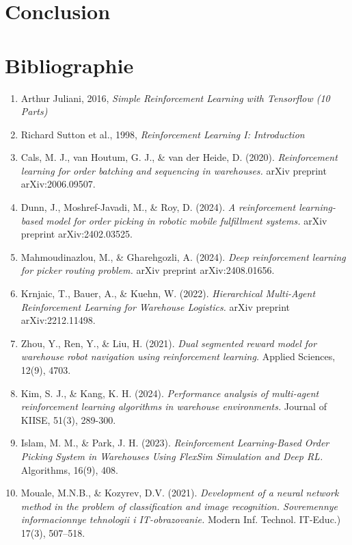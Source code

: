 \documentclass{article}
\begin{document}
\section*{Conclusion}

\section*{Bibliographie}
\begin{enumerate}
    \item Arthur Juliani, 2016, \textit{Simple Reinforcement Learning with Tensorflow (10 Parts)}
    \item Richard Sutton et al., 1998, \textit{Reinforcement Learning I: Introduction}
    \item Cals, M. J., van Houtum, G. J., \& van der Heide, D. (2020). \textit{Reinforcement learning for order batching and sequencing in warehouses.} arXiv preprint arXiv:2006.09507.
    \item Dunn, J., Moshref-Javadi, M., \& Roy, D. (2024). \textit{A reinforcement learning-based model for order picking in robotic mobile fulfillment systems.} arXiv preprint arXiv:2402.03525.
    \item Mahmoudinazlou, M., \& Gharehgozli, A. (2024). \textit{Deep reinforcement learning for picker routing problem.} arXiv preprint arXiv:2408.01656.
    \item Krnjaic, T., Bauer, A., \& Kuehn, W. (2022). \textit{Hierarchical Multi-Agent Reinforcement Learning for Warehouse Logistics.} arXiv preprint arXiv:2212.11498.
    \item Zhou, Y., Ren, Y., \& Liu, H. (2021). \textit{Dual segmented reward model for warehouse robot navigation using reinforcement learning.} Applied Sciences, 12(9), 4703.
    \item Kim, S. J., \& Kang, K. H. (2024). \textit{Performance analysis of multi-agent reinforcement learning algorithms in warehouse environments.} Journal of KIISE, 51(3), 289-300.
    \item Islam, M. M., \& Park, J. H. (2023). \textit{Reinforcement Learning-Based Order Picking System in Warehouses Using FlexSim Simulation and Deep RL.} Algorithms, 16(9), 408.
\item Mouale, M.N.B., \&  Kozyrev, D.V. (2021). \textit{Development of a neural network method in the problem of classification and image recognition. Sovremennye informacionnye tehnologii i IT-obrazovanie.} Modern Inf. Technol. IT-Educ.) 17(3), 507–518.

\end{enumerate}
\end{document}
